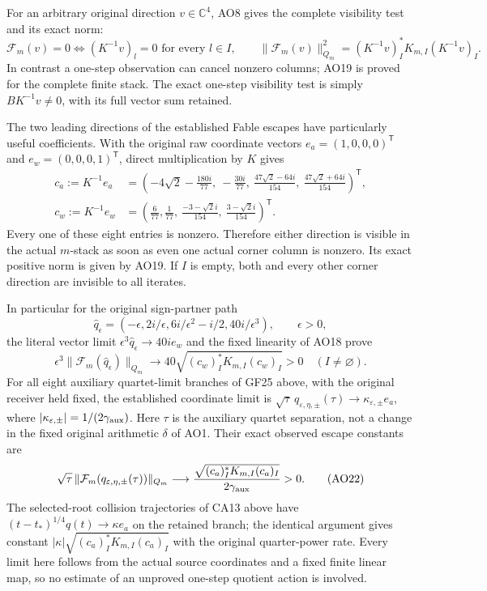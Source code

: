 \documentclass[11pt]{article}
\newcommand{\C}{\mathbb C}
\begin{document}
For an arbitrary original direction $v\in\C^4$, AO8 gives
the complete visibility test and its exact norm:
\begin{equation}
 \mathcal F_m(v)=0\iff (K^{-1}v)_l=0\text{ for every }l\in I,
 \qquad
 \|\mathcal F_m(v)\|_{Q_m}^2
    =(K^{-1}v)_I^*K_{m,I}(K^{-1}v)_I.
 \tag{AO19}
\end{equation}
In contrast a one-step observation can cancel nonzero columns;
AO19 is proved for the complete finite stack. The exact
one-step visibility test is simply $BK^{-1}v\ne0$, with
its full vector sum retained.

The two leading directions of the established Fable escapes
have particularly useful coefficients. With the original raw
coordinate vectors $e_a=(1,0,0,0)^{\mathsf T}$ and
$e_w=(0,0,0,1)^{\mathsf T}$, direct multiplication by $K$ gives
\begin{align}
 c_a:=K^{-1}e_a
 &=\left(-4\sqrt2-\frac{180i}{77},\ -\frac{30i}{77},\
          \frac{47\sqrt2-64i}{154},\
          \frac{47\sqrt2+64i}{154}\right)^{\mathsf T},\nonumber\\
 c_w:=K^{-1}e_w
 &=\left(\frac6{77},\frac1{77},\
          \frac{-3-\sqrt2i}{154},\
          \frac{3-\sqrt2i}{154}\right)^{\mathsf T}.
 \tag{AO20}
\end{align}
Every one of these eight entries is nonzero. Therefore either
direction is visible in the actual $m$-stack as soon as even
one actual corner column is nonzero. Its exact positive norm
is given by AO19. If $I$ is empty, both and every other
corner direction are invisible to all iterates.

In particular for the original sign-partner path
\[
 \widehat q_\epsilon=(-\epsilon,2i/\epsilon,
                     6i/\epsilon^2-i/2,40i/\epsilon^3),
 \qquad\epsilon>0,
\]
the literal vector limit $\epsilon^3\widehat q_\epsilon\to40ie_w$
and the fixed linearity of AO18 prove
\begin{equation}
 \epsilon^3\|\mathcal F_m(\widehat q_\epsilon)\|_{Q_m}
 \longrightarrow40\sqrt{(c_w)_I^*K_{m,I}(c_w)_I}>0
 \quad(I\ne\varnothing).
 \tag{AO21}
\end{equation}
For all eight auxiliary quartet-limit branches of GF25 above,
with the original receiver held fixed, the established coordinate
limit is $\sqrt\tau\,q_{\varepsilon,\eta,\pm}(\tau)
\to\kappa_{\varepsilon,\pm}e_a$, where
$|\kappa_{\varepsilon,\pm}|=1/(2\gamma_{\rm aux})$.
Here $\tau$ is the auxiliary quartet separation, not a change
in the fixed original arithmetic $\delta$ of AO1. Their exact
observed escape constants are
\begin{equation}
 \sqrt\tau\,\|\mathcal F_m(q_{\varepsilon,\eta,\pm}(\tau))\|_{Q_m}
 \longrightarrow\frac{\sqrt{(c_a)_I^*K_{m,I}(c_a)_I}}
                         {2\gamma_{\rm aux}}>0.
 \tag{AO22}
\end{equation}
The selected-root collision trajectories of CA13 above
have $(t-t_*)^{1/4}q(t)\to\kappa e_a$ on the retained branch;
the identical argument gives constant
$|\kappa|\sqrt{(c_a)_I^*K_{m,I}(c_a)_I}$ with the original
quarter-power rate. Every limit here follows from the actual
source coordinates and a fixed finite linear map, so no
estimate of an unproved one-step quotient action is involved.
\end{document}
